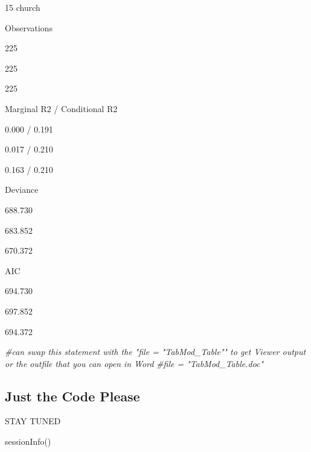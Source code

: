 \documentclass[
  english,
]{book}
\newenvironment{Shaded}{\begin{snugshade}}{\end{snugshade}}
\newcommand{\CommentTok}[1]{\textcolor[rgb]{0.56,0.35,0.01}{\textit{#1}}}
\newcommand{\FunctionTok}[1]{\textcolor[rgb]{0.00,0.00,0.00}{#1}}
\newcommand{\NormalTok}[1]{#1}
\begin{document}
15 church

Observations

225

225

225

Marginal R2 / Conditional R2

0.000 / 0.191

0.017 / 0.210

0.163 / 0.210

Deviance

688.730

683.852

670.372

AIC

694.730

697.852

694.372

\begin{Shaded}
\begin{Highlighting}[]
\CommentTok{\#can swap this statement with the "file = "TabMod\_Table"" to get Viewer output or the outfile that you can open in Word}
\CommentTok{\#file = "TabMod\_Table.doc"}
\end{Highlighting}
\end{Shaded}

\hypertarget{just-the-code-please}{%
\subsection{Just the Code Please}\label{just-the-code-please}}

STAY TUNED

\begin{Shaded}
\begin{Highlighting}[]
\FunctionTok{sessionInfo}\NormalTok{()}
\end{Highlighting}
\end{Shaded}
\end{document}
